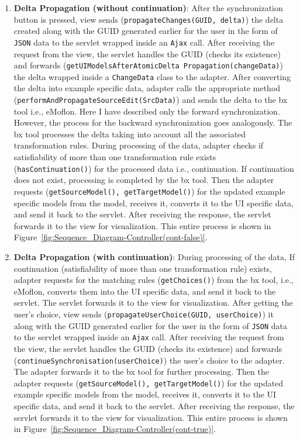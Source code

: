 \begin{enumerate}
	\item {\textbf{Delta Propagation (without continuation)}: After the synchronization button is pressed, view sends (\texttt{propagateChanges(GUID, delta)}) the delta created along with the GUID generated earlier for the user in the form of \texttt{JSON} data to the servlet wrapped inside an \texttt{Ajax} call. After receiving the request from the view, the servlet handles the GUID (checks its existence) and forwards (\texttt{getUIModelsAfterAtomicDelta Propagation(changeData)}) the delta wrapped inside a \texttt{ChangeData} class to the adapter. After converting the delta into example specific data, adapter calls the appropriate method (\texttt{performAndPropagateSourceEdit(SrcData)}) and sends the delta to the bx tool i.e., eMoflon. Here I have described only the forward synchronization. However, the process for the backward synchronization goes analogously. The bx tool processes the delta taking into account all the associated transformation rules. During processing of the data, adapter checks if satisfiability of more than one transformation rule exists (\texttt{hasContinuation()}) for the processed data i.e., continuation. If continuation does not exist, processing is completed by the bx tool. Then the adapter requests (\texttt{getSourceModel(), getTargetModel()}) for the updated example specific models from the model, receives it, converts it to the UI specific data, and send it back to the servlet. After receiving the response, the servlet forwards it to the view for visualization. This entire process is shown in Figure~\ref{fig:Sequence_Diagram-Controller(cont-false)}.}
	
	\item {\textbf{Delta Propagation (with continuation)}: During processing of the data, If continuation (satisfiability of more than one transformation rule) exists, adapter requests for the matching rules (\texttt{getChoices()}) from the bx tool, i.e., eMoflon, converts them into the UI specific data, and send it back to the servlet. The servlet forwards it to the view for visualization. After getting the user's choice, view sends (\texttt{propagateUserChoice(GUID, userChoice)}) it along with the GUID generated earlier for the user in the form of \texttt{JSON} data to the servlet wrapped inside an \texttt{Ajax} call. After receiving the request from the view, the servlet handles the GUID (checks its existence) and forwards (\texttt{continueSynchronisation(userChoice)}) the user's choice to the adapter. The adapter forwards it to the bx tool for further processing. Then the adapter requests (\texttt{getSourceModel(), getTargetModel()}) for the updated example specific models from the model, receives it, converts it to the UI specific data, and send it back to the servlet. After receiving the response, the servlet forwards it to the view for visualization. This entire process is shown in Figure~\ref{fig:Sequence_Diagram-Controller(cont-true)}.}
\end{enumerate}

